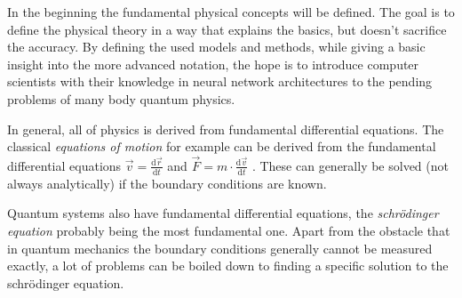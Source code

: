 In the beginning the fundamental physical concepts will be defined. 
The goal is to define the physical theory in a way that explains the basics, but doesn't sacrifice the accuracy. 
By defining the used models and methods, while giving a basic insight into the more advanced notation, the hope is to introduce computer scientists with their knowledge in neural network architectures to the pending problems of many body quantum physics.

In general, all of physics is derived from fundamental differential equations. 
The classical \emph{equations of motion} for example can be derived from the fundamental differential equations $\vec{v} = \frac{\mathrm{d}\vec{r}}{\mathrm{d}t}$ and $\vec{F} = m \cdot \frac{\mathrm{d}\vec{v}}{\mathrm{d}t}$ \cite*[]{demtroderExperimentalphysik}.
These can generally be solved (not always analytically) if the boundary conditions are known.

Quantum systems also have fundamental differential equations, the \emph{schrödinger equation} probably being the most fundamental one. Apart from the obstacle that in quantum mechanics the boundary conditions generally cannot be measured exactly, a lot of problems can be boiled down to finding a specific solution to the schrödinger equation.